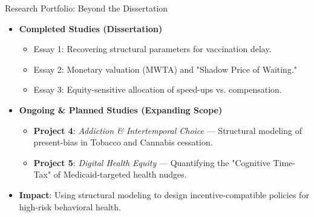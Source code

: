 \documentclass[10pt]{beamer}
\begin{document}
\begin{frame}{Research Portfolio: Beyond the Dissertation}
    \begin{itemize}
        \item \textbf{Completed Studies (Dissertation)}
            \begin{itemize}
                \item Essay 1: Recovering structural parameters for vaccination delay.
                \item Essay 2: Monetary valuation (MWTA) and "Shadow Price of Waiting."
                \item Essay 3: Equity-sensitive allocation of speed-ups vs. compensation.
            \end{itemize}
        \item \textbf{Ongoing \& Planned Studies (Expanding Scope)}
            \begin{itemize}
                \item \textbf{Project 4}: \textit{Addiction \& Intertemporal Choice} --- Structural modeling of present-bias in \alert{Tobacco and Cannabis cessation}.
                \item \textbf{Project 5}: \textit{Digital Health Equity} --- Quantifying the \alert{"Cognitive Time-Tax"} of Medicaid-targeted health nudges.
            \end{itemize}
        \item \textbf{Impact}: Using structural modeling to design incentive-compatible policies for \alert{high-risk behavioral health}.
    \end{itemize}
\end{frame}
\end{document}
